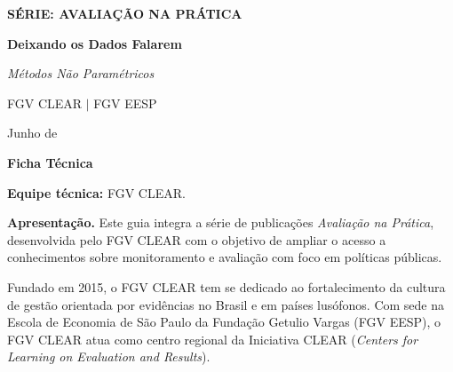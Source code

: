 \documentclass[12pt, a4paper, openany]{book}
\begin{document}
\frontmatter

\thispagestyle{empty}
\begin{center}
\vspace*{3cm}

{\Large\bfseries\color{clearlightblue} SÉRIE: AVALIAÇÃO NA PRÁTICA}

\vspace{1.8cm}

{\Huge\bfseries\color{clearblue} Deixando os Dados Falarem}

\vspace{0.6cm}

{\Large\color{clearblue}\textit{Métodos Não Paramétricos}}

\vspace{2.2cm}

{\large FGV CLEAR $|$ FGV EESP}

\vspace{0.5cm}

{\large Junho de \the\year}

\vfill
\end{center}
\newpage

\thispagestyle{empty}
\vspace*{1.5cm}

{\Large\bfseries\color{clearblue} Ficha Técnica}

\bigskip

\noindent\textbf{Equipe técnica:} FGV CLEAR.

\bigskip

\noindent\textbf{Apresentação.} Este guia integra a série de publicações
\textit{Avaliação na Prática}, desenvolvida pelo FGV CLEAR com o objetivo
de ampliar o acesso a conhecimentos sobre monitoramento e avaliação com
foco em políticas públicas.

\medskip

\noindent Fundado em 2015, o FGV CLEAR tem se dedicado ao fortalecimento
da cultura de gestão orientada por evidências no Brasil e em países
lusófonos. Com sede na Escola de Economia de São Paulo da Fundação Getulio
Vargas (FGV EESP), o FGV CLEAR atua como centro regional da Iniciativa
CLEAR (\textit{Centers for Learning on Evaluation and Results}).

\medskip
\end{document}
